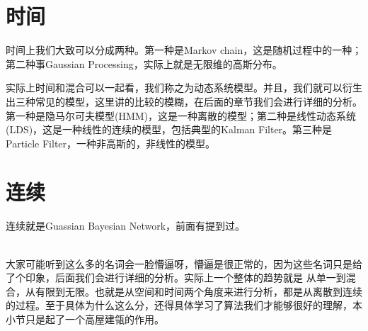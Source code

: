 \documentclass[a4paper]{article}
\begin{document}
\section{时间}
时间上我们大致可以分成两种。第一种是Markov chain，这是随机过程中的一种；第二种事Gaussian Processing，实际上就是无限维的高斯分布。

实际上时间和混合可以一起看，我们称之为动态系统模型。并且，我们就可以衍生出三种常见的模型，这里讲的比较的模糊，在后面的章节我们会进行详细的分析。第一种是隐马尔可夫模型(HMM)，这是一种离散的模型；第二种是线性动态系统(LDS)，这是一种线性的连续的模型，包括典型的Kalman Filter。第三种是Particle Filter，一种非高斯的，非线性的模型。

\section{连续}
连续就是Guassian Bayesian Network，前面有提到过。

~\\

大家可能听到这么多的名词会一脸懵逼呀，懵逼是很正常的，因为这些名词只是给了个印象，后面我们会进行详细的分析。实际上一个整体的趋势就是{\color{red} 从单一到混合，从有限到无限。}也就是从空间和时间两个角度来进行分析，都是从离散到连续的过程。至于具体为什么这么分，还得具体学习了算法我们才能够很好的理解，本小节只是起了一个高屋建瓴的作用。
\end{document}
